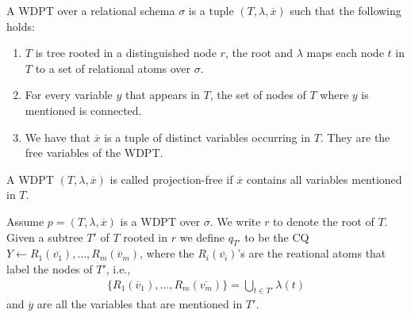 			\begin{definition}\label{def:wdpt}
				A WDPT over a relational schema $\sigma$ is a tuple $(T, \lambda, \overline{x})$
				such that the following holds:
				\begin{enumerate}
					\item $T$ is tree rooted in a distinguished node $r$, the root and $\lambda$
						maps each node $t$ in $T$ to a set of relational atoms over $\sigma$.
					\item For every variable $y$ that appears in $T$, the set of nodes of $T$ where
						$y$ is mentioned is connected.
					\item We have that $\overline{x}$ is a tuple of distinct variables occurring in
						$T$. They are the free variables of the WDPT.
				\end{enumerate}
			\end{definition}

			\begin{definition}
				A WDPT $(T,\lambda, \overline{x})$ is called projection-free if $\overline{x}$
				contains all variables mentioned in $T$.
			\end{definition}

			\begin{definition}\label{wdptq}
				Assume $p = (T,\lambda,\overline{x})$ is a WDPT over $\sigma$. We write $r$ to
				denote the root of $T$. Given a subtree $T'$ of $T$ rooted in $r$ we define
				$q_{T'}$ to be the CQ $Y \leftarrow R_1(\overline{v_1}), \dots,
				R_m(\overline{v}_m)$, where the $R_i(\overline{v_i})$'s are the reational atoms
				that label the nodes of $T'$, i.e., 
				\begin{align*}
					\{ R_1(\overline{v}_1), \dots, R_m(\overline{v_m}) \} = \bigcup_{t \in T'} \lambda(t) 
				\end{align*} and $\overline{y}$ are all the variables that are mentioned in
				$T'$. 
			\end{definition}

